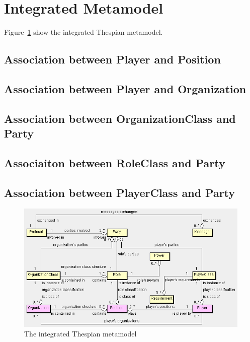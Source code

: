 \section{Integrated Metamodel}

Figure~\ref{figure:thespian-integrated-metamodel} show the integrated Thespian metamodel.

\subsection*{Association between Player and Position}

\subsection*{Association between Player and Organization}

\subsection*{Association between OrganizationClass and Party}

\subsection*{Associaiton between RoleClass and Party}

\subsection*{Association between PlayerClass and Party}

\begin{figure}[ht]
	\centering
	\includegraphics[width=\textwidth]{images/thespian-integrated-metamodel.png}
	\caption{The integrated Thespian metamodel}
	\label{figure:thespian-integrated-metamodel}
\end{figure}

